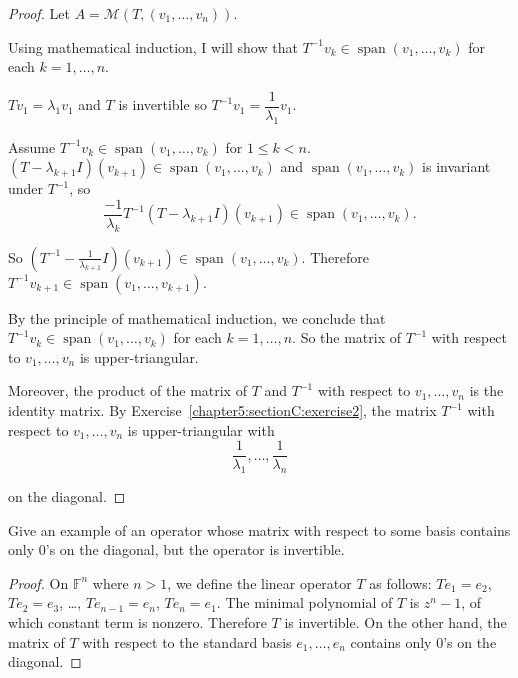 \begin{proof}
    Let $A = \mathcal{M}(T, (v_{1}, \ldots, v_{n}))$.

    Using mathematical induction, I will show that $T^{-1}v_{k}\in\operatorname{span}(v_{1}, \ldots, v_{k})$ for each $k = 1,\ldots, n$.

    $Tv_{1} = \lambda_{1}v_{1}$ and $T$ is invertible so $T^{-1}v_{1} = \dfrac{1}{\lambda_{1}}v_{1}$.

    Assume $T^{-1}v_{k}\in\operatorname{span}(v_{1}, \ldots, v_{k})$ for $1\leq k < n$. $(T - \lambda_{k+1}I)(v_{k+1}) \in \operatorname{span}(v_{1}, \ldots, v_{k})$ and $\operatorname{span}(v_{1}, \ldots, v_{k})$ is invariant under $T^{-1}$, so
    \[
        \frac{-1}{\lambda_{k}}T^{-1}(T - \lambda_{k+1}I)(v_{k+1}) \in \operatorname{span}(v_{1}, \ldots, v_{k}).
    \]

    So $(T^{-1} - \frac{1}{\lambda_{k+1}}I)(v_{k+1}) \in \operatorname{span}(v_{1}, \ldots, v_{k})$. Therefore $T^{-1}v_{k+1}\in \operatorname{span}(v_{1}, \ldots, v_{k+1})$.

    By the principle of mathematical induction, we conclude that $T^{-1}v_{k}\in\operatorname{span}(v_{1}, \ldots, v_{k})$ for each $k = 1,\ldots, n$. So the matrix of $T^{-1}$ with respect to $v_{1}, \ldots, v_{n}$ is upper-triangular.

    Moreover, the product of the matrix of $T$ and $T^{-1}$ with respect to $v_{1}, \ldots, v_{n}$ is the identity matrix. By Exercise~\ref{chapter5:sectionC:exercise2}, the matrix $T^{-1}$ with respect to $v_{1}, \ldots, v_{n}$ is upper-triangular with
    \[
        \frac{1}{\lambda_{1}}, \ldots, \frac{1}{\lambda_{n}}
    \]

    on the diagonal.
\end{proof}
\newpage

\begin{exercise}
    Give an example of an operator whose matrix with respect to some basis contains only $0$'s on the diagonal, but the operator is invertible.
\end{exercise}

\begin{proof}
    On $\mathbb{F}^{n}$ where $n > 1$, we define the linear operator $T$ as follows: $Te_{1} = e_{2}$, $Te_{2} = e_{3}$, \ldots, $Te_{n-1} = e_{n}$, $Te_{n} = e_{1}$. The minimal polynomial of $T$ is $z^{n} - 1$, of which constant term is nonzero. Therefore $T$ is invertible. On the other hand, the matrix of $T$ with respect to the standard basis $e_{1}, \ldots, e_{n}$ contains only $0$'s on the diagonal.
\end{proof}
\newpage

